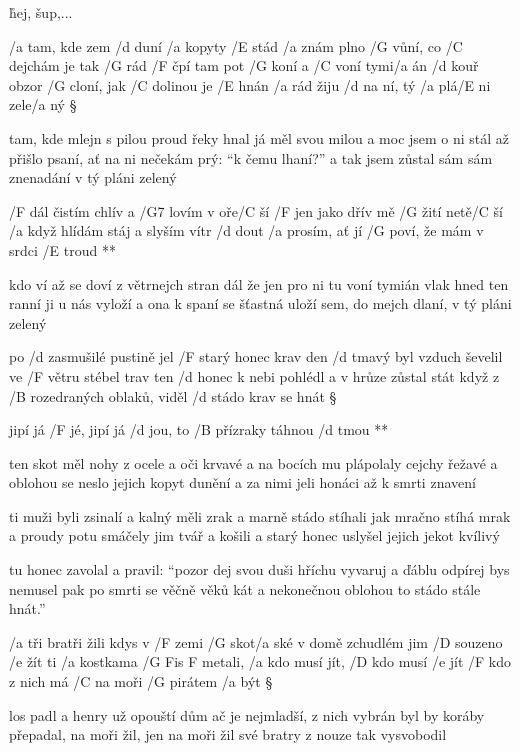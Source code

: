 \r hej, šup,...




/a tam, kde zem /d duní /a kopyty /E stád
/a znám plno /G vůní, co /C dejchám je tak /G rád
/F čpí tam pot /G koní a /C voní tymi/a án
/d kouř obzor /G cloní, jak /C dolinou je /E hnán
/a rád žiju /d na ní, tý /a plá/E ni zele/a ný \S

tam, kde mlejn s pilou proud řeky hnal
já měl svou milou a moc jsem o ni stál
až přišlo psaní, ať na ni nečekám
prý: ``k čemu lhaní?'' a tak jsem zůstal sám
sám znenadání v tý pláni zelený \s

\R /F dál čistím chlív a /G7 lovím v oře/C ší
   /F jen jako dřív mě /G žití netě/C ší
   /a když hlídám stáj a slyším vítr /d dout
   /a prosím, ať jí /G poví, že mám v srdci /E troud **

kdo ví až se doví z větrnejch stran
dál že jen pro ni tu voní tymián
vlak hned ten ranní ji u nás vyloží
a ona k spaní se šťastná uloží
sem, do mejch dlaní, v tý pláni zelený




po /d zasmušilé pustině jel /F starý honec krav
den /d tmavý byl vzduch ševelil ve /F větru stébel trav
ten /d honec k nebi pohlédl a v hrůze zůstal stát
když z /B rozedraných oblaků, viděl /d stádo krav se hnát \S

\R jipí já /F jé, jipí já /d jou, to /B přízraky táhnou /d tmou **

ten skot měl nohy z ocele a oči krvavé
a na bocích mu plápolaly cejchy řežavé
a oblohou se neslo jejich kopyt dunění
a za nimi jeli honáci až k smrti znavení \s

ti muži byli zsinalí a kalný měli zrak
a marně stádo stíhali jak mračno stíhá mrak
a proudy potu smáčely jim tvář a košili
a starý honec uslyšel jejich jekot kvílivý \s

tu honec zavolal a pravil: ``pozor dej
svou duši hříchu vyvaruj a ďáblu odpírej
bys nemusel pak po smrti se věčně věků kát
a nekonečnou oblohou to stádo stále hnát.'' \s




/a tři bratři žili kdys v /F zemi /G skot/a ské
v domě zchudlém jim /D souzeno /e žít
ti /a kostkama /{G Fis F } metali, /a kdo musí jít, /D kdo musí /e jít
/F kdo z nich má /C na moři /G pirátem /a být \S

los padl a henry už opouští dům
ač je nejmladší, z nich vybrán byl
by koráby přepadal, na moři žil, jen na moři žil
své bratry z nouze tak vysvobodil \songgg

